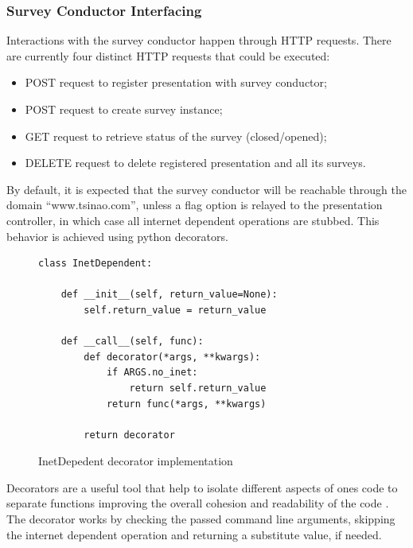 \documentclass[12pt, fleqn, a4paper]{article}
\begin{document}
\subsubsection{Survey Conductor Interfacing}
Interactions with the survey conductor happen through HTTP requests. There are currently four distinct HTTP requests that could be executed:
\begin{itemize}
	\item POST request to register presentation with survey conductor;
	\item POST request to create survey instance;
	\item GET request to retrieve status of the survey (closed/opened);
	\item DELETE request to delete registered presentation and all its surveys.
\end{itemize}
By default, it is expected that the survey conductor will be reachable through the domain \enquote{www.tsinao.com}, unless a flag option is relayed to the presentation controller, in which case all internet dependent operations are stubbed. This behavior is achieved using python decorators.
\begin{figure}[H]
	\centering
	\begin{verbatim} 
class InetDependent:

    def __init__(self, return_value=None):
        self.return_value = return_value

    def __call__(self, func):
        def decorator(*args, **kwargs):
            if ARGS.no_inet:
                return self.return_value
            return func(*args, **kwargs)

        return decorator
	\end{verbatim}
	\caption{InetDepedent decorator implementation}
\end{figure}
Decorators are a useful tool that help to isolate different aspects of ones code to separate functions improving the overall cohesion and readability of the code \citep{anaya_2021}. 
The  decorator works by checking the passed command line arguments, skipping the internet dependent operation and returning a substitute value, if needed.
\end{document}
